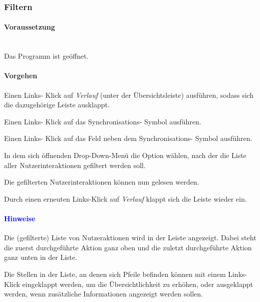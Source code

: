 \documentclass[enabledeprecatedfontcommands,fontsize=11pt,paper=a4,twoside]{scrartcl}
\newcounter{one}
\newcounter{two}[one]
\newcommand*{\hint}{\paragraph{\textcolor{blue}{Hinweise}}}
\newcommand*{\condition}{\paragraph{Voraussetzung}$\;$ \vspace{0.2cm}\\}
\newcommand*{\action}{\paragraph{Vorgehen}}
\let\tempone\itemize
\let\temptwo\enditemize
\renewenvironment{itemize}{\tempone\addtolength{\itemsep}{-10.0pt}}{\temptwo}
\let\origenumerate\enumerate
\let\origendenumerate\endenumerate
\renewenvironment{enumerate}{\origenumerate \addtolength{\itemsep}{-10.0pt}}{\origendenumerate}
\begin{document}
\subsubsection{Filtern}
	\condition 
	Das Programm ist geöffnet.
	\action
	\begin{enumerate}
		\item Einen Links- Klick auf \textit{Verlauf} (unter der Übersichtsleiste) ausführen, sodass sich die dazugehörige Leiste ausklappt.
		\item Einen Links- Klick auf das Synchronisations- Symbol ausführen.
		\item Einen Links- Klick auf das Feld neben dem Synchronisations- Symbol ausführen.
		\item In dem sich öffnenden Drop-Down-Menü die Option wählen, nach der die Liste aller Nutzerinteraktionen gefiltert werden soll.
		\item Die gefilterten Nutzerinteraktionen können nun gelesen werden. 
		\item Durch einen erneuten Links-Klick auf \textit{Verlauf} klappt sich die Leiste wieder ein.
	\end{enumerate} 
	\hint 
	\begin{itemize}
		\item Die (gefilterte) Liste von Nutzeraktionen wird in der Leiste angezeigt. Dabei steht die zuerst durchgeführte Aktion ganz oben und die zuletzt durchgeführte Aktion ganz unten in der Liste.
		\item Die Stellen in der Liste, an denen sich Pfeile befinden können mit einem Links-Klick eingeklappt werden, um die Übersichtlichkeit zu erhöhen, oder ausgeklappt werden, wenn zusätzliche Informationen angezeigt werden sollen.
	\end{itemize}

	\begin{figure}[ht!]
		\centering
	\end{figure}
		
\end{document}
